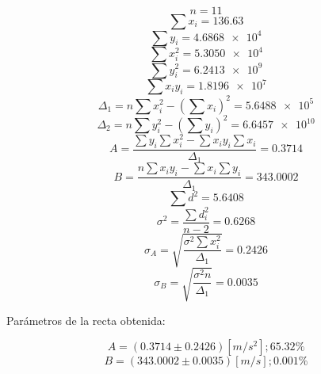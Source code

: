 \documentclass[letter,11pt]{article}
\begin{document}
\begin{equation*}
    n = 11
\end{equation*}
\begin{equation*}
    \sum x_i = 136.63
\end{equation*}
\begin{equation*}
    \sum y_i = \num{4.6868e4}
\end{equation*}
\begin{equation*}
    \sum x^2_i = \num{5.3050e4}
\end{equation*}
\begin{equation*}
    \sum y^2_i = \num{6.2413e9}
\end{equation*}
\begin{equation*}
    \sum x_i y_i = \num{1.8196e7}
\end{equation*}
\begin{equation*}
    \Delta_1 = n \sum x^2_i - \left( \sum x_i \right)^2 = \num{5.6488e5}
\end{equation*}
\begin{equation*}
    \Delta_2 = n \sum y^2_i - \left( \sum y_i \right)^2 = \num{6.6457e10}
\end{equation*}
\begin{equation*}
    A = \frac{\sum y_i \sum x^2_i - \sum x_i y_i \sum x_i}{\Delta_1} = 0.3714
\end{equation*}
\begin{equation*}
    B = \frac{n \sum x_i y_i - \sum x_i \sum y_i}{\Delta_1} = 343.0002
\end{equation*}
\begin{equation*}
    \sum d^2 = 5.6408
\end{equation*}
\begin{equation*}
    \sigma^2 = \frac{\sum d^2_i}{n-2} = 0.6268
\end{equation*}
\begin{equation*}
    \sigma_A = \sqrt{\frac{\sigma^2 \sum x^2_i}{\Delta_1}} = 0.2426
\end{equation*}
\begin{equation*}
    \sigma_B = \sqrt{\frac{\sigma^2 n}{\Delta_1}} = 0.0035
\end{equation*}
\vspace{0.10cm}

Parámetros de la recta obtenida:

\begin{equation*}
    A = (0.3714 \pm 0.2426) [m/s^2]; 65.32\%
\end{equation*}
\begin{equation*}
    B = (343.0002 \pm 0.0035) [m/s]; 0.001\%
\end{equation*}
\vspace{0.10cm}
\end{document}
